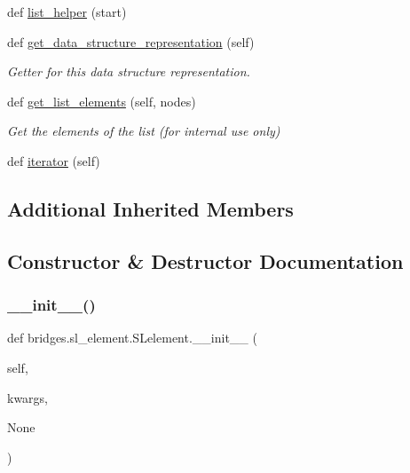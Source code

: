 \begin{DoxyCompactItemize}
def \hyperlink{classbridges_1_1sl__element_1_1_s_lelement_a7aaed085f18082fab6d027ca014130ca}{list\+\_\+helper} (start)
\item 
def \hyperlink{classbridges_1_1sl__element_1_1_s_lelement_af1d3039c3597ce0345d1cd973711714f}{get\+\_\+data\+\_\+structure\+\_\+representation} (self)
\begin{DoxyCompactList}\small\item\em Getter for this data structure representation. \end{DoxyCompactList}\item 
def \hyperlink{classbridges_1_1sl__element_1_1_s_lelement_ad3b94c8e7540aca841e6306c190e1be1}{get\+\_\+list\+\_\+elements} (self, nodes)
\begin{DoxyCompactList}\small\item\em Get the elements of the list (for internal use only) \end{DoxyCompactList}\item 
def \hyperlink{classbridges_1_1sl__element_1_1_s_lelement_a60570a813d474577ab1150bdd60137f9}{iterator} (self)
\end{DoxyCompactItemize}
\subsection*{Additional Inherited Members}


\subsection{Constructor \& Destructor Documentation}
\mbox{\label{classbridges_1_1sl__element_1_1_s_lelement_af95c000aa951fbf1c5912892248389d2}} 
\subsubsection{\texorpdfstring{\+\_\+\+\_\+init\+\_\+\+\_\+()}{\_\_init\_\_()}}
{\footnotesize\ttfamily def bridges.\+sl\+\_\+element.\+S\+Lelement.\+\_\+\+\_\+init\+\_\+\+\_\+ (\begin{DoxyParamCaption}\item[{}]{self,  }\item[{}]{kwargs,  }\item[{}]{None }\end{DoxyParamCaption})}



